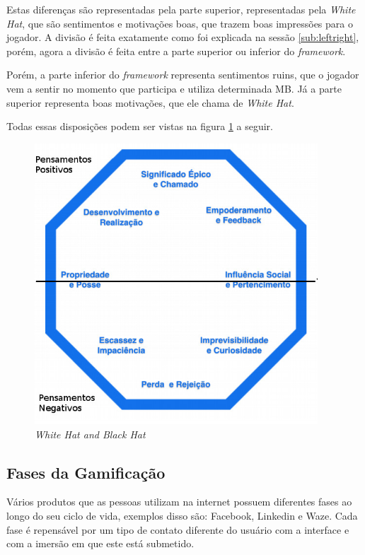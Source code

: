 Estas diferenças são representadas pela parte superior, representadas
pela \textit{White Hat}, que são sentimentos e motivações boas, que trazem
boas impressões para o jogador. A divisão é feita exatamente como
foi explicada na sessão \ref{sub:leftright}, porém, agora a
divisão é feita entre a parte superior ou inferior do \textit{framework}.

Porém, a parte inferior do \textit{framework} representa sentimentos ruins, que o jogador
vem a sentir no momento que participa e utiliza determinada MB. Já a
parte superior representa boas motivações, que ele chama de \textit{White Hat}.

Todas essas disposições podem ser vistas na figura
\ref{fig:octalysiswhiteblack} a seguir.

\begin{figure}[h]
    \centering
    \includegraphics[width=400px, scale=1]{figuras/octalysiswhiteblack}
    \caption{\textit{White Hat and Black Hat}}
    \label{fig:octalysiswhiteblack}
\end{figure}

\subsection{Fases da Gamificação}
\label{sub:fasesgamifição}
Vários produtos que as pessoas utilizam na internet possuem diferentes
fases ao longo do seu ciclo de vida, exemplos disso são: Facebook, Linkedin e Waze.
Cada fase é repensável por um tipo de contato diferente
do usuário com a interface e com a imersão em que este está submetido.

